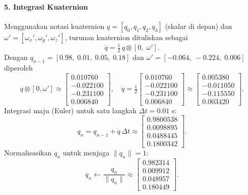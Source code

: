 \paragraph{5. Integrasi Kuaternion}

Menggunakan notasi kuaternion $q = [q_0, q_1, q_2, q_3]$ (skalar di depan) dan
$\omega' = [\omega_x',\omega_y',\omega_z']$, turunan kuaternion dituliskan sebagai
{\setlength{\abovedisplayskip}{8pt}%
	\setlength{\belowdisplayskip}{8pt}%
\[
\dot{q} = \tfrac{1}{2}\, q \otimes [0,\;\omega'].
\]}
Dengan $q_{n-1} = [0.98,\; 0.01,\; 0.05,\; 0.18]$ dan $\omega' = [-0.064,\;-0.224,\;0.006]$ diperoleh
{\setlength{\abovedisplayskip}{8pt}%
	\setlength{\belowdisplayskip}{8pt}%
\[
q\otimes[0,\omega'] \approx
\begin{bmatrix}
0.010760\\
-0.022100\\
-0.231100\\
0.006840
\end{bmatrix},
\quad
\dot{q} = \tfrac{1}{2}
\begin{bmatrix}
0.010760\\
-0.022100\\
-0.231100\\
0.006840
\end{bmatrix}
\approx
\begin{bmatrix}
0.005380\\
-0.011050\\
-0.115550\\
0.003420
\end{bmatrix}.
\]}
Integrasi maju (Euler) untuk satu langkah $\Delta t = 0.01$ s:
{\setlength{\abovedisplayskip}{8pt}%
	\setlength{\belowdisplayskip}{8pt}%
\[
q_{n} = q_{n-1} + \dot{q}\,\Delta t
\approx
\begin{bmatrix}
0.9800538\\
0.0098895\\
0.0488445\\
0.1800342
\end{bmatrix}.
\]}
Normalisasikan $q_n$ untuk menjaga $\lVert q_n\rVert = 1$:
{\setlength{\abovedisplayskip}{8pt}%
	\setlength{\belowdisplayskip}{8pt}%
\[
q_{n} \leftarrow \frac{q_{n}}{\lVert q_{n}\rVert}
\approx
\begin{bmatrix}
0.982314\\
0.009912\\
0.048957\\
0.180449
\end{bmatrix}.
\]}

